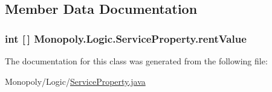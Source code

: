 \subsection{Member Data Documentation}
\subsubsection[{\texorpdfstring{rent\+Value}{rentValue}}]{\setlength{\rightskip}{0pt plus 5cm}int \mbox{[}$\,$\mbox{]} Monopoly.\+Logic.\+Service\+Property.\+rent\+Value\hspace{0.3cm}{\ttfamily [private]}}\hypertarget{class_monopoly_1_1_logic_1_1_service_property_ab03c954de837e6c827ed4646170ffbb9}{}\label{class_monopoly_1_1_logic_1_1_service_property_ab03c954de837e6c827ed4646170ffbb9}


The documentation for this class was generated from the following file\+:\begin{DoxyCompactItemize}
\item 
Monopoly/\+Logic/\hyperlink{_service_property_8java}{Service\+Property.\+java}\end{DoxyCompactItemize}

